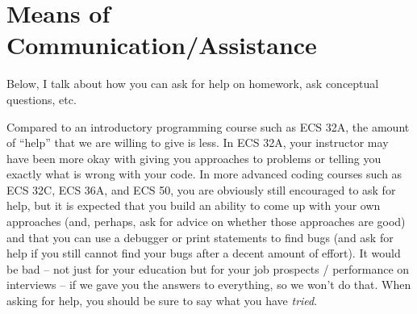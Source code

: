 \documentclass{article}
\begin{document}
\section{Means of Communication/Assistance}

Below, I talk about how you can ask for help on homework, ask conceptual questions, etc.

Compared to an introductory programming course such as ECS 32A, the amount of ``help'' that we are willing to give is less. In ECS 32A, your instructor may have been more okay with giving you approaches to problems or telling you exactly what is wrong with your code. In more advanced coding courses such as ECS 32C, ECS 36A, and ECS 50, you are obviously still encouraged to ask for help, but it is expected that you build an ability to come up with your own approaches (and, perhaps, ask for advice on whether those approaches are good) and that you can use a debugger or print statements to find bugs (and ask for help if you still cannot find your bugs after a decent amount of effort). It would be bad -- not just for your education but for your job prospects / performance on interviews -- if we gave you the answers to everything, so we won't do that. When asking for help, you should be sure to say what you have \textit{tried}.
\end{document}
